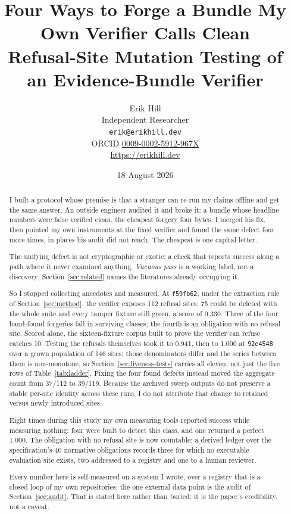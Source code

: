 \documentclass[11pt]{article}
\title{Four Ways to Forge a Bundle My Own Verifier Calls Clean\\
\large Refusal-Site Mutation Testing of an Evidence-Bundle Verifier}
\author{%
  Erik Hill\\
  Independent Researcher\\
  \texttt{erik@erikhill.dev}\\
  ORCID \href{https://orcid.org/0009-0002-5912-967X}{0009-0002-5912-967X}\\
  \url{https://erikhill.dev}
}
\date{18 August 2026}
\begin{document}
\maketitle

\begin{abstract}
I built a protocol whose premise is that a stranger can re-run my claims offline and get
the same answer. An outside engineer audited it and broke it: a bundle whose
headline numbers were false verified clean, the cheapest forgery four bytes. I merged his fix, then pointed my own
instruments at the fixed verifier and found the same defect four more times, in places his
audit did not reach. The cheapest is one capital letter.

The unifying defect is not cryptographic or exotic: a check that reports success along a
path where it never examined anything. \emph{Vacuous pass} is a working label, not a
discovery; Section~\ref{sec:related} names the literatures already occupying it.

So I stopped collecting anecdotes and measured. At \texttt{f59fb62}, under the extraction
rule of Section~\ref{sec:method}, the verifier exposes 112 refusal sites; 75 could be deleted with
the whole suite and every tamper fixture still green, a score of 0.330. Three of the four hand-found forgeries fall in surviving classes; the fourth is an obligation
with no refusal site. Scored alone, the sixteen-fixture corpus built to prove
the verifier can refuse catches 10. Testing
the refusals themselves took it to 0.941, then to 1.000 at \texttt{92e4548} over a grown
population of 146 sites; those denominators differ and the series between them is non-monotone, so
Section~\ref{sec:liveness-tests} carries all eleven, not just the five rows of
Table~\ref{tab:ladder}. Fixing the four
found defects instead moved the aggregate count from 37/112 to 39/119. Because the
archived sweep outputs do not preserve a stable per-site identity across these runs,
I do not attribute that change to retained versus newly introduced sites.

Eight times during this study my own measuring tools reported success while measuring
nothing; four were built to detect this class, and one returned a perfect 1.000. The obligation
with no refusal site is now countable: a derived ledger over the specification's 40 normative
obligations records three for which no executable evaluation site exists, two addressed to a
registry and one to a human reviewer.

Every number here is self-measured on a system I wrote, over a registry that is a closed loop
of my own repositories; the one external data point is the audit of Section~\ref{sec:audit}.
That is stated here rather than buried: it is the paper's credibility, not a caveat.
\end{abstract}
\end{document}
